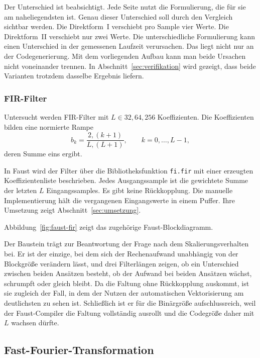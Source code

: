 Der Unterschied ist beabsichtigt. Jede Seite nutzt die Formulierung, die für sie am naheliegendsten ist. Genau dieser Unterschied soll durch den Vergleich sichtbar werden. Die Direktform~I verschiebt pro Sample vier Werte. Die Direktform~II verschiebt nur zwei Werte. Die unterschiedliche Formulierung kann einen Unterschied in der gemessenen Laufzeit verursachen. Das liegt nicht nur an der Codegenerierung. Mit dem vorliegenden Aufbau kann man beide Ursachen nicht voneinander trennen. In Abschnitt~\ref{sec:verifikation} wird gezeigt, dass beide Varianten trotzdem dasselbe Ergebnis liefern.

\subsubsection*{FIR-Filter}

Untersucht werden FIR-Filter mit $L \in {32, 64, 256}$ Koeffizienten. Die
Koeffizienten bilden eine normierte Rampe
\begin{equation}
	b_k = \frac{2,(k+1)}{L,(L+1)}, \qquad k = 0, \dots, L-1,
	\label{eq:fir-koeff}
\end{equation}
deren Summe eins ergibt.

In Faust wird der Filter über die Bibliotheksfunktion \texttt{fi.fir} mit einer erzeugten Koeffizientenliste beschrieben. Jedes Ausgangssample ist die gewichtete Summe der letzten $L$ Eingangssamples. Es gibt keine Rückkopplung. Die manuelle Implementierung hält die vergangenen Eingangswerte in einem
Puffer. Ihre Umsetzung zeigt Abschnitt~\ref{sec:umsetzung}.

Abbildung~\ref{fig:faust-fir} zeigt das zugehörige Faust-Blockdiagramm.


Der Baustein trägt zur Beantwortung der Frage nach dem Skalierungsverhalten bei. Er ist der einzige, bei dem sich der Rechenaufwand unabhängig von der Blockgröße verändern lässt, und drei Filterlängen zeigen, ob ein Unterschied zwischen beiden Ansätzen besteht, ob der Aufwand bei beiden Ansätzen wächst, schrumpft oder gleich bleibt. Da die Faltung ohne Rückkopplung auskommt, ist sie zugleich der Fall, in dem der Nutzen der automatischen Vektorisierung am deutlichsten zu sehen ist. Schließlich ist er für die Binärgröße aufschlussreich, weil der Faust-Compiler die Faltung vollständig ausrollt und die Codegröße daher mit
$L$ wachsen dürfte.

\clearpage
\subsection{Fast-Fourier-Transformation}
\label{subsec:fft}

